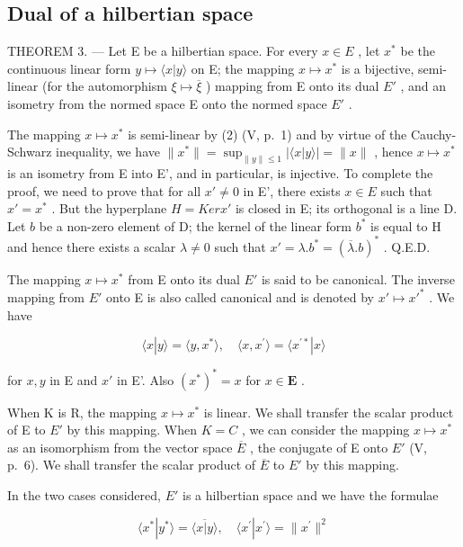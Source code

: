 \subsection{Dual of a hilbertian space}

THEOREM 3. --- Let E be a hilbertian space. For every \(x \in E\) , let \(x^{*}\) be the continuous linear form \(y \mapsto \langle x | y \rangle\) on E; the mapping \(x \mapsto x^{*}\) is a bijective, semi-linear (for the automorphism \(\xi \mapsto \overline{\xi}\) ) mapping from E onto its dual \(E'\) , and an isometry from the normed space E onto the normed space \(E'\) .

The mapping \(x \mapsto x^*\) is semi-linear by (2) (V, p.~1) and by virtue of the Cauchy-Schwarz inequality, we have \(\| x^* \| = \sup_{\| y \| \leqslant 1} |\langle x | y \rangle| = \| x \|\) , hence \(x \mapsto x^*\) is an isometry from E into E', and in particular, is injective. To complete the proof, we need to prove that for all \(x' \neq 0\) in E', there exists \(x \in E\) such that \(x' = x^*\) . But the hyperplane \(H = Ker x'\) is closed in E; its orthogonal is a line D. Let \(b\) be a non-zero element of D; the kernel of the linear form \(b^*\) is equal to H and hence there exists a scalar \(\lambda \neq 0\) such that \(x' = \lambda . b^* = (\overline{\lambda}. b)^*\) . Q.E.D.

The mapping \(x \mapsto x^{*}\) from E onto its dual \(E'\) is said to be canonical. The inverse mapping from \(E'\) onto E is also called canonical and is denoted by \(x' \mapsto x'^{*}\) . We have

\[
\langle x | y \rangle = \langle y, x ^ {*} \rangle , \quad \langle x, x ^ {\prime} \rangle = \langle x ^ {\prime *} | x \rangle\tag{17}
\]

for \(x, y\) in E and \(x'\) in E'. Also \((x^{*})^{*} = x\) for \(x \in \mathbf{E}\) .

When K is R, the mapping \(x \mapsto x^{*}\) is linear. We shall transfer the scalar product of E to \(E'\) by this mapping. When \(K = C\) , we can consider the mapping \(x \mapsto x^{*}\) as an isomorphism from the vector space \(\overline{E}\) , the conjugate of E onto \(E'\) (V, p.~6). We shall transfer the scalar product of \(\overline{E}\) to \(E'\) by this mapping.

In the two cases considered, \(E'\) is a hilbertian space and we have the formulae

\[
\langle x ^ {*} | y ^ {*} \rangle = \overline {{\langle x | y \rangle}}, \quad \langle x ^ {\prime} | x ^ {\prime} \rangle = \| x ^ {\prime} \| ^ {2}
\]

